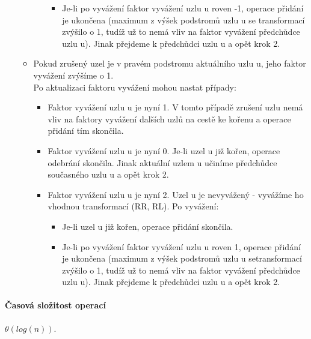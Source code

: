 \documentclass[10pt,a4paper]{article}
\begin{document}
\begin{enumerate}
\begin{itemize}
\begin{itemize}
\begin{itemize}
				\item Je-li po vyvážení faktor vyvážení uzlu u roven -1, operace přidání je ukončena (maximum z výšek podstromů uzlu u se transformací zvýšilo o 1, tudíž už to nemá vliv na faktor vyvážení předchůdce uzlu u). Jinak přejdeme k předchůdci uzlu u a opět krok 2.
			\end{itemize}
		\end{itemize}
		\item Pokud zrušený uzel je v pravém podstromu aktuálního uzlu u, jeho faktor vyvážení zvýšíme o 1. \\
		Po aktualizaci faktoru vyvážení mohou nastat případy:
		\begin{itemize}
			\item Faktor vyvážení uzlu u je nyní 1. V tomto případě zrušení uzlu nemá vliv na faktory vyvážení dalších uzlů na cestě ke kořenu a operace přidání tím skončila.
			\item Faktor vyvážení uzlu u je nyní 0. Je-li uzel u již kořen, operace odebrání skončila. Jinak aktuální uzlem u učiníme předchůdce současného uzlu u a opět krok 2.
			\item Faktor vyvážení uzlu u je nyní 2. Uzel u je nevyvážený - vyvážíme ho vhodnou transformací (RR, RL). Po vyvážení:
			\begin{itemize}
				\item Je-li uzel u již kořen, operace přidání skončila.
				\item Je-li po vyvážení faktor vyvážení uzlu u roven 1, operace přidání je ukončena (maximum z výšek podstromů uzlu u setransformací zvýšilo o 1, tudíž už to nemá vliv na faktor vyvážení předchůdce uzlu u). Jinak přejdeme k předchůdci uzlu u a opět krok 2.
			\end{itemize}
		\end{itemize}
	\end{itemize}
\end{enumerate}
\paragraph{Časová složitost operací} $\theta(log(n))$.
\end{document}
